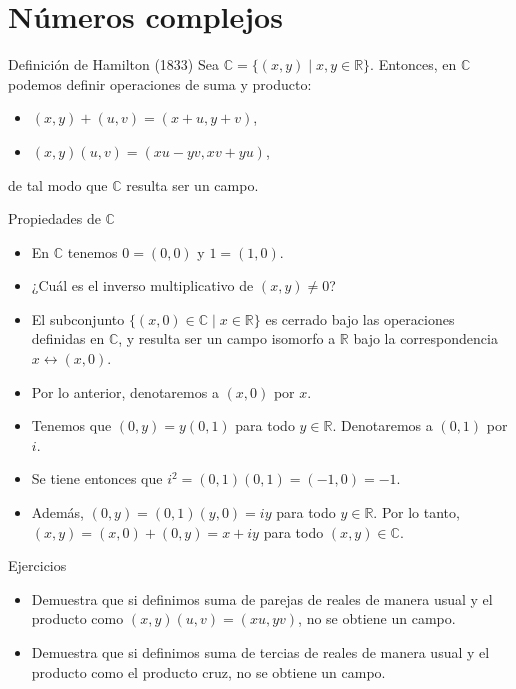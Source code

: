 \documentclass[spanish,presentation]{beamer}
\begin{document}
\section{Números complejos}
\label{sec-3}

\begin{frame}[label=sec-3-1]{Definición de Hamilton (1833)}
Sea \(\mathbb{C}=\{(x,y)\mid x,y\in \mathbb{R}\}\). Entonces, en
\(\mathbb{C}\) podemos definir operaciones de suma y producto:

\begin{itemize}
\item \((x,y)+(u,v)=(x+u,y+v)\),
\item \((x,y)(u,v)=(xu-yv,xv+yu)\),
\end{itemize}

de tal modo que \(\mathbb{C}\) resulta ser un campo.
\end{frame}

\begin{frame}[label=sec-3-2]{Propiedades de \(\mathbb{C}\)}
\begin{itemize}
\item En \(\mathbb{C}\) tenemos \(0=(0,0)\) y \(1=(1,0)\).
\item ¿Cuál es el inverso multiplicativo de \((x,y)\ne 0\)?
\item El subconjunto \(\{(x,0)\in \mathbb{C}\mid x\in \mathbb{R}\}\)
es cerrado bajo las operaciones definidas en \(\mathbb{C}\), y
resulta ser un campo isomorfo a \(\mathbb{R}\) bajo la
correspondencia \(x\leftrightarrow (x,0)\).
\item Por lo anterior, denotaremos a \((x,0)\) por \(x\).
\item Tenemos que \((0,y)=y(0,1)\) para todo \(y\in
     \mathbb{R}\). Denotaremos a \((0,1)\) por \(i\).
\item Se tiene entonces que \(i^{2}=(0,1)(0,1)=(-1,0)=-1.\)
\item Además, \((0,y)=(0,1)(y,0)=iy\) para todo \(y\in\mathbb{R}\). Por
lo tanto, \((x,y)=(x,0)+(0,y)=x+iy\) para todo
\((x,y)\in\mathbb{C}\).
\end{itemize}
\end{frame}

\begin{frame}[label=sec-3-3]{Ejercicios}
\begin{itemize}
\item Demuestra que si definimos suma de parejas de reales de manera
usual y el producto como \((x,y)(u,v)=(xu,yv)\), no se obtiene un
campo.
\item Demuestra que si definimos suma de tercias de reales de manera
usual y el producto como el producto cruz, no se obtiene un campo.
\end{itemize}
\end{frame}
\end{document}
